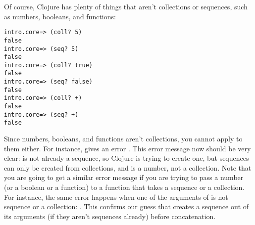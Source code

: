 Of course, Clojure has plenty of things that aren't collections or sequences, such as numbers, booleans, and functions:
\begin{framed}
\begin{verbatim}
intro.core=> (coll? 5)
false
intro.core=> (seq? 5)
false
intro.core=> (coll? true)
false
intro.core=> (seq? false)
false
intro.core=> (coll? +)
false
intro.core=> (seq? +)
false
\end{verbatim}
\end{framed} 
Since numbers, booleans, and functions aren't collections, you cannot apply  to them either. For instance,  gives an error . This error message now should be very clear:  is not already a sequence, so Clojure is trying to create one, but sequences can only be created from collections, and  is a number, not a collection. Note that you are going to get a similar error message if you are trying to pass a number (or a boolean or a function) to a function that takes a sequence or a collection. For instance, the same error   happens when one of the arguments of  is not sequence or a collection: . This confirms our guess that  creates a sequence out of its arguments (if they aren't sequences already) before concatenation. 

